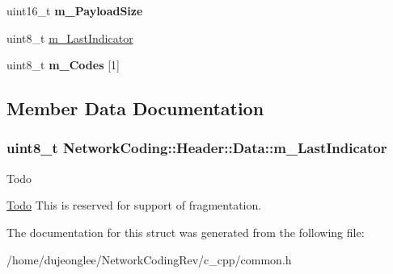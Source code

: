 \begin{DoxyCompactItemize}
\item 
uint16\+\_\+t {\bfseries m\+\_\+\+Payload\+Size}\hypertarget{struct_network_coding_1_1_header_1_1_data_a9718b3a6987a63cdca1a1ae09ef79f24}{}\label{struct_network_coding_1_1_header_1_1_data_a9718b3a6987a63cdca1a1ae09ef79f24}

\item 
uint8\+\_\+t \hyperlink{struct_network_coding_1_1_header_1_1_data_a21e3e58d1a143834d9c4490613d3c3ff}{m\+\_\+\+Last\+Indicator}
\item 
uint8\+\_\+t {\bfseries m\+\_\+\+Codes} \mbox{[}1\mbox{]}\hypertarget{struct_network_coding_1_1_header_1_1_data_ae5000aecfcf9559c5cf47c8eea4d8c02}{}\label{struct_network_coding_1_1_header_1_1_data_ae5000aecfcf9559c5cf47c8eea4d8c02}

\end{DoxyCompactItemize}


\subsection{Member Data Documentation}
\subsubsection[{\texorpdfstring{m\+\_\+\+Last\+Indicator}{m_LastIndicator}}]{\setlength{\rightskip}{0pt plus 5cm}uint8\+\_\+t Network\+Coding\+::\+Header\+::\+Data\+::m\+\_\+\+Last\+Indicator}\hypertarget{struct_network_coding_1_1_header_1_1_data_a21e3e58d1a143834d9c4490613d3c3ff}{}\label{struct_network_coding_1_1_header_1_1_data_a21e3e58d1a143834d9c4490613d3c3ff}
\begin{DoxyRefDesc}{Todo}
\item[\hyperlink{todo__todo000001}{Todo}]This is reserved for support of fragmentation. \end{DoxyRefDesc}


The documentation for this struct was generated from the following file\+:\begin{DoxyCompactItemize}
\item 
/home/dujeonglee/\+Network\+Coding\+Rev/c\+\_\+cpp/common.\+h\end{DoxyCompactItemize}
